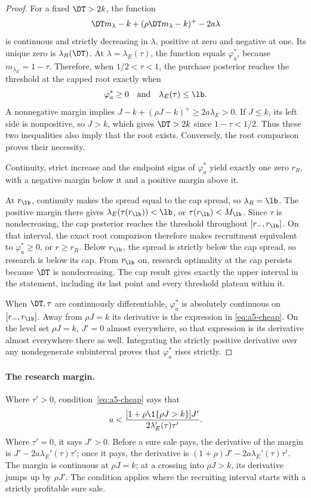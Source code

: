 \begin{proof}
For a fixed \(\DT>2k\), the function
\[
 \DT m_\lambda-k+(\rho\DT m_\lambda-k)^+-2a\lambda
\]
is continuous and strictly decreasing in \(\lambda\), positive at zero and negative at one. Its unique zero is
\(\lambda_R(\DT)\). At \(\lambda=\lambda_E(\tau)\), the function equals \(\varphi_a^*\), because
\(m_{\lambda_E}=1-\tau\). Therefore, when \(1/2<\tau<1\), the purchase posterior reaches the threshold at the
capped root exactly when
\[
 \varphi_a^*\ge0\quad\hbox{and}\quad\lambda_E(\tau)\le\lb.
\]
A nonnegative margin implies \(J-k+(\rho J-k)^+\ge2a\lambda_E>0\). If \(J\le k\), its left side is nonpositive,
so \(J>k\), which gives \(\DT>2k\) since \(1-\tau<1/2\). Thus these two inequalities also imply that the root
exists. Conversely, the root comparison proves their necessity.

Continuity, strict increase and the endpoint signs of \(\varphi_a^*\) yield exactly one zero \(r_R\), with a
negative margin below it and a positive margin above it.

At \(r_{\lb}\), continuity makes the spread equal to the cap spread, so \(\lambda_R=\lb\). The positive margin there gives
\(\lambda_E(\tau(r_{\lb}))<\lb\), or \(\tau(r_{\lb})<M_{\lb}\). Since \(\tau\) is nondecreasing, the cap
posterior reaches the threshold throughout \([r_-,r_{\lb}]\). On that interval, the exact root comparison
therefore makes recruitment equivalent to \(\varphi_a^*\ge0\), or \(r\ge r_R\). Below \(r_{\lb}\), the spread
is strictly below the cap spread, so research is below its cap. From \(r_{\lb}\) on, research optimality at the
cap persists because \(\DT\) is nondecreasing. The cap result gives exactly the upper interval in the statement,
including its last point and every threshold plateau within it.

When \(\DT,\tau\) are continuously differentiable, \(\varphi_a^*\) is absolutely continuous on
\([r_-,r_{\lb}]\). Away from \(\rho J=k\) its derivative is the expression in \eqref{eq:a5-cheap}.
On the level set \(\rho J=k\), \(J'=0\) almost everywhere, so that expression is its derivative almost
everywhere there as well. Integrating the strictly positive derivative over any nondegenerate subinterval
proves that \(\varphi_a^*\) rises strictly.
\end{proof}

\paragraph{The research margin.}
Where \(\tau'>0\), condition~\eqref{eq:a5-cheap} says that
\[
 a<\frac{[1+\rho\1\{\rho J>k\}]J'}{2\lambda_E'(\tau)\tau'}.
\]
Where \(\tau'=0\), it says \(J'>0\). Before a sure sale pays, the derivative of the margin is
\(J'-2a\lambda_E'(\tau)\tau'\); once it pays, the derivative is
\((1+\rho)J'-2a\lambda_E'(\tau)\tau'\). The margin is continuous at \(\rho J=k\); at a crossing into
\(\rho J>k\), its derivative jumps up by \(\rho J'\). The condition applies where the recruiting interval
starts with a strictly profitable sure sale.

